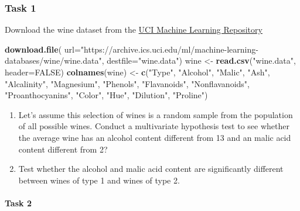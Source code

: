 \documentclass[
]{book}
\newenvironment{Shaded}{\begin{snugshade}}{\end{snugshade}}
\newcommand{\AttributeTok}[1]{\textcolor[rgb]{0.13,0.29,0.53}{#1}}
\newcommand{\ConstantTok}[1]{\textcolor[rgb]{0.56,0.35,0.01}{#1}}
\newcommand{\FunctionTok}[1]{\textcolor[rgb]{0.13,0.29,0.53}{\textbf{#1}}}
\newcommand{\NormalTok}[1]{#1}
\newcommand{\OtherTok}[1]{\textcolor[rgb]{0.56,0.35,0.01}{#1}}
\newcommand{\StringTok}[1]{\textcolor[rgb]{0.31,0.60,0.02}{#1}}
\theoremstyle{definition}
\theoremstyle{definition}
\theoremstyle{definition}
\theoremstyle{definition}
\theoremstyle{remark}
\begin{document}
\hypertarget{task-1-2}{%
\subsubsection*{Task 1}\label{task-1-2}}

Download the wine dataset from the \href{https://archive.ics.uci.edu/ml/datasets/wine}{UCI Machine Learning Repository}

\begin{Shaded}
\begin{Highlighting}[]
\FunctionTok{download.file}\NormalTok{(}
  \AttributeTok{url=}\StringTok{"https://archive.ics.uci.edu/ml/machine{-}learning{-}databases/wine/wine.data"}\NormalTok{, }
              \AttributeTok{destfile=}\StringTok{"wine.data"}\NormalTok{)}
\NormalTok{wine }\OtherTok{\textless{}{-}} \FunctionTok{read.csv}\NormalTok{(}\StringTok{"wine.data"}\NormalTok{, }\AttributeTok{header=}\ConstantTok{FALSE}\NormalTok{)}
\FunctionTok{colnames}\NormalTok{(wine) }\OtherTok{\textless{}{-}} \FunctionTok{c}\NormalTok{(}\StringTok{"Type"}\NormalTok{, }\StringTok{"Alcohol"}\NormalTok{, }\StringTok{"Malic"}\NormalTok{,}
\StringTok{"Ash"}\NormalTok{,}
\StringTok{"Alcalinity"}\NormalTok{,}
\StringTok{"Magnesium"}\NormalTok{,}
\StringTok{"Phenols"}\NormalTok{,}
\StringTok{"Flavanoids"}\NormalTok{,}
\StringTok{"Nonflavanoids"}\NormalTok{,}
\StringTok{"Proanthocyanins"}\NormalTok{,}
\StringTok{"Color"}\NormalTok{,}
\StringTok{"Hue"}\NormalTok{,}
\StringTok{"Dilution"}\NormalTok{,}
\StringTok{"Proline"}\NormalTok{)}
\end{Highlighting}
\end{Shaded}

\begin{enumerate}
\def\labelenumi{\roman{enumi}.}
\item
  Let's assume this selection of wines is a random sample from the population of all possible wines. Conduct a multivariate hypothesis test to see whether the average wine has an alcohol content different from 13 and an malic acid content different from 2?
\item
  Test whether the alcohol and malic acid content are significantly different between wines of type 1 and wines of type 2.
\end{enumerate}

\hypertarget{task-2-2}{%
\paragraph*{Task 2}\label{task-2-2}}
\end{document}
